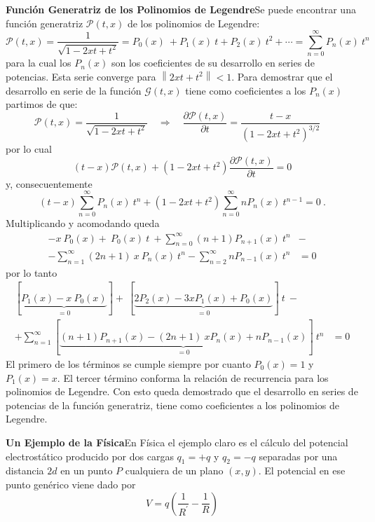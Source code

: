 \documentclass[spanish,notitlepage,letterpaper,12pt]{article}
\begin{document}
\textbf{Funci\'{o}n Generatriz de los Polinomios de Legendre}\newline Se puede
encontrar una funci\'{o}n generatriz $\mathcal{P}(t,x)$ de los polinomios de
Legendre:
\[
\mathcal{P}(t,x)=\frac1{\sqrt{1-2xt+t^{2}}}=P_{0}(x)\ +P_{1}(x)\ t+P_{2}%
(x)\ t^{2}+\cdots=\sum_{n=0}^{\infty}P_{n}(x)\ t^{n}
\]
para la cual los $P_{n}(x)$ son los coeficientes de su desarrollo en series de
potencias. Esta serie converge para $\left\|  2xt+t^{2}\right\|  <1.$ Para
demostrar que el desarrollo en serie de la funci\'{o}n $\mathcal{G}(t,x)$
tiene como coeficientes a los $P_{n}(x)$ partimos de que:
\[
\mathcal{P}(t,x)=\frac1{\sqrt{1-2xt+t^{2}}}\quad\Rightarrow\quad\frac
{\partial\mathcal{P}(t,x)}{\partial t}=\frac{t-x}{\left(  1-2xt+t^{2}\right)
^{3/2}}\quad
\]
por lo cual
\[
\left(  t-x\right)  \mathcal{P}(t,x)+\left(  1-2xt+t^{2}\right)
\frac{\partial\mathcal{P}(t,x)}{\partial t}=0
\]
y, consecuentemente
\[
\left(  t-x\right)  \sum_{n=0}^{\infty}P_{n}(x)\ t^{n}+\left(  1-2xt+t^{2}%
\right)  \sum_{n=0}^{\infty}nP_{n}(x)\ t^{n-1}=0\ .
\]
Multiplicando y acomodando queda
\begin{align*}
-x\ P_{0}(x)+\ P_{0}(x)\ t\ +\sum_{n=0}^{\infty}\left(  n+1\right)
P_{n+1}(x)\ t^{n}  & -\\
-\sum_{n=1}^{\infty}\left(  2n+1\right)  \ x\ P_{n}(x)\ t^{n}-\sum
_{n=2}^{\infty}nP_{n-1}(x)\ t^{n}  & =0
\end{align*}
por lo tanto
\begin{align*}
\left[  \underbrace{P_{1}(x)-x\ P_{0}(x)}_{=0}\right]  +\ \left[
\underbrace{2P_{2}(x)-3xP_{1}(x)+P_{0}(x)}_{=0}\right]  \ t\ -  & \\
+\sum_{n=1}^{\infty}\left[  \underbrace{\left(  n+1\right)  P_{n+1}(x)-\left(
2n+1\right)  \ xP_{n}(x)+nP_{n-1}(x)}_{=0}\right]  \ t^{n}  & =0
\end{align*}
El primero de los t\'{e}rminos se cumple siempre por cuanto $P_{0}(x)=1$ y
$P_{1}(x)=x.$ El tercer t\'{e}rmino conforma la relaci\'{o}n de recurrencia
para los polinomios de Legendre. Con esto queda demostrado que el desarrollo
en series de potencias de la funci\'{o}n generatriz, tiene como coeficientes a
los polinomios de Legendre.

\textbf{Un Ejemplo de la F\'{i}sica}\newline En F\'{i}sica el ejemplo claro es
el c\'{a}lculo del potencial electrost\'{a}tico producido por dos cargas
$q_{1}=+q$ y $q_{2}=-q$ separadas por una distancia $2d$ en un punto $P$
cualquiera de un plano $\left(  x,y\right)  $. El potencial en ese punto
gen\'{e}rico viene dado por
\[
V=q\left(  \frac{1}{R^{\prime}}-\frac{1}{R}\right)
\]%
\end{document}
